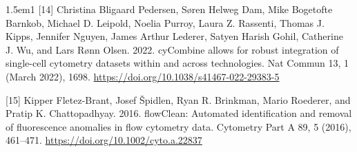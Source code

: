 \documentclass[ASNA]{latex/wiley/USG}
\begin{document}
\begin{hangparas}{1.5em}{1}
{[}14{]} Christina Bligaard Pedersen, Søren Helweg Dam, Mike Bogetofte
Barnkob, Michael D. Leipold, Noelia Purroy, Laura Z. Rassenti, Thomas J.
Kipps, Jennifer Nguyen, James Arthur Lederer, Satyen Harish Gohil,
Catherine J. Wu, and Lars Rønn Olsen. 2022. cyCombine allows for robust
integration of single-cell cytometry datasets within and across
technologies. Nat Commun 13, 1 (March 2022), 1698.
\url{https://doi.org/10.1038/s41467-022-29383-5}

{[}15{]} Kipper Fletez-Brant, Josef Špidlen, Ryan R. Brinkman, Mario
Roederer, and Pratip K. Chattopadhyay. 2016. flowClean: Automated
identification and removal of fluorescence anomalies in flow cytometry
data. Cytometry Part A 89, 5 (2016), 461--471.
\url{https://doi.org/10.1002/cyto.a.22837}

\end{hangparas}
\end{document}

